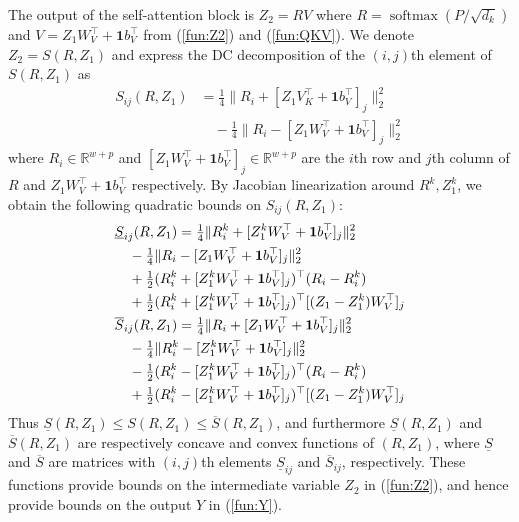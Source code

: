 \documentclass{ifacconf}
\DeclareMathOperator{\softmax}{softmax}
\begin{document}
The output of the self-attention block is $Z_2 =RV$ where $R=\softmax(P/\sqrt{d_k})$ and $V= Z_1 W_V^\top + \mathbf{1}b_V^\top$ from (\ref{fun:Z2}) and (\ref{fun:QKV}). We denote $Z_2 = S(R,Z_1)$ and express the DC decomposition of the $(i,j)$th element of $S(R,Z_1)$ as
\begin{align*}
S_{ij}(R,Z_1) &= 
\tfrac{1}{4} \| R_i + [Z_1V_K^\top + \mathbf{1} b_V^\top ]_j \|^2_2
\\
&\quad - \tfrac{1}{4} \| R_i - [Z_1W_V^\top +\mathbf{1} b_V^\top ]_j \|^2_2
\end{align*}
where $R_i \in\mathbb{R}^{w+p}$ and $[Z_1W_V^\top +\mathbf{1} b_V^\top ]_j \in\mathbb{R}^{w+p}$ are the $i$th row and $j$th column of $R$ and $Z_1W_V^\top +\mathbf{1} b_V^\top$ respectively.
By Jacobian linearization around \(R^k, Z_1^k\), we obtain the following quadratic bounds on \(S_{ij}(R,Z_1)\):
\begin{align}
    & \underline{S}_{ij}(R,Z_1) = \tfrac{1}{4} \| R_i^k + [Z_1^kW_V^\top + \mathbf{1} b_V^\top ]_j \|^2_2 
\notag\\ 
    &\quad -\tfrac{1}{4} \|R_i - [Z_1W_V^\top + \mathbf{1} b_V^\top]_j \|^2_2 
\notag\\ 
    &\quad + \tfrac{1}{2}(R_i^k + [Z_1^kW_V^\top + \mathbf{1} b_V^\top]_j)^\top (R_i-R_i^k) 
\notag\\
    &\quad + \tfrac{1}{2}(R_i^k + [Z_1^kW_V^\top + \mathbf{1} b_V^\top]_j)^\top [ (Z_1-Z_1^k) W_V^\top]_j
\label{fun:Sboundlow}
\\
    &\overline{S}_{ij}(R,Z_1) = \tfrac{1}{4} \| R_i + [Z_1W_V^\top + \mathbf{1} b_V^\top]_j \|^2_2 
\notag\\ 
    &\quad - \tfrac{1}{4} \| R^k_i - [Z_1^kW_V^\top + \mathbf{1} b_V^\top ]_j \|^2_2 
\notag\\ 
    &\quad - \tfrac{1}{2}  (R_i^k - [Z_1^kW_V^\top + \mathbf{1} b_V^\top]_j  )^\top
 (R_i- R_i^k)
\notag\\
    &\quad + \tfrac{1}{2}( R_i^k - [Z_1^kW_V^\top + \mathbf{1} b_V^\top]_j )^\top  [(Z_1-Z_1^k) W_V^\top]_j
\label{fun:Sboundup}
\end{align}
Thus $\underline{S}(R,Z_1) \le S(R,Z_1) \le \overline{S}(R,Z_1)$, and furthermore $\underline{S}(R,Z_1)$ and $\overline{S}(R,Z_1)$ are respectively concave and convex functions of $(R,Z_1)$, where $\underline{S}$ and $\overline{S}$ are matrices with $(i,j)$th elements $\underline{S}_{ij}$ and $\overline{S}_{ij}$, respectively.
These functions provide bounds on the intermediate variable $Z_2$ in (\ref{fun:Z2}), and hence provide bounds on the output $Y$ in
(\ref{fun:Y}). 
\end{document}
